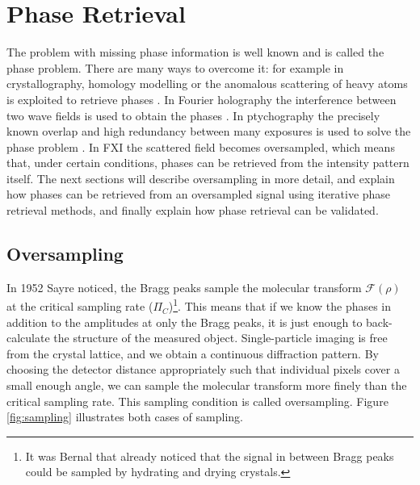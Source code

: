 \chapter{Phase Retrieval}
The problem with missing phase information is well known and is called the phase problem. There are many ways to overcome it: for example in crystallography, homology modelling or the anomalous scattering of heavy atoms is exploited to retrieve phases \cite{Rossmann1972,Arndt1978}. In Fourier holography the interference between two wave fields is used to obtain the phases \cite{McNulty1992, Eisebitt2004, Marchesini2008}. In ptychography the precisely known overlap and high redundancy between many exposures is used to solve the phase problem \cite{Rodenburg2007,Thibault2009}. In FXI the scattered field becomes oversampled, which means that, under certain conditions, phases can be retrieved from the intensity pattern itself. The next sections will describe oversampling in more detail, and explain how phases can be retrieved from an oversampled signal using iterative phase retrieval methods, and finally explain how phase retrieval can be validated. 

\section{Oversampling} 
In 1952 Sayre noticed, the Bragg peaks sample the molecular transform $\mathcal{F}(\rho)$ at the critical sampling rate ($\Pi_C$)\cite{Sayre1952a, Shannon1949a}\footnote{It was Bernal \cite{Bernal1938} that already noticed that the signal in between Bragg peaks could be sampled by hydrating and drying crystals.}. This means that if we know the phases in addition to the amplitudes at only the Bragg peaks, it is just enough to back-calculate the structure of the measured object. Single-particle imaging is free from the crystal lattice, and we obtain a continuous diffraction pattern. By choosing the detector distance appropriately such that individual pixels cover a small enough angle, we can sample the molecular transform more finely than the critical sampling rate. This sampling condition is called oversampling. Figure \ref{fig:sampling} illustrates both cases of sampling. 

